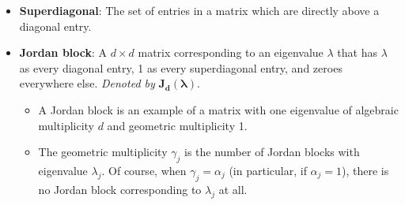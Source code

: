 \documentclass[../notes.tex]{subfiles}
\begin{document}
\begin{itemize}
\begin{itemize}
    \end{itemize}
    \item \textbf{Superdiagonal}: The set of entries in a matrix which are directly above a diagonal entry.
    \item \textbf{Jordan block}: A $d\times d$ matrix corresponding to an eigenvalue $\lambda$ that has $\lambda$ as every diagonal entry, 1 as every superdiagonal entry, and zeroes everywhere else. \emph{Denoted by} $\bm{J_d(\lambda)}$.
    \begin{itemize}
        \item A Jordan block is an example of a matrix with one eigenvalue of algebraic multiplicity $d$ and geometric multiplicity 1.
        \item The geometric multiplicity $\gamma_j$ is the number of Jordan blocks with eigenvalue $\lambda_j$. Of course, when $\gamma_j=\alpha_j$ (in particular, if $\alpha_j=1$), there is no Jordan block corresponding to $\lambda_j$ at all.
    \end{itemize}

\end{itemize}
\end{document}
